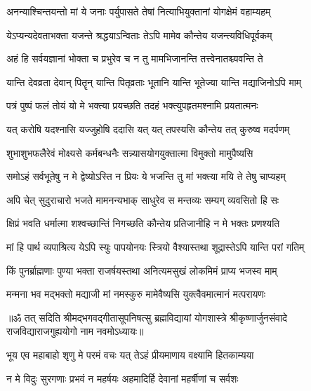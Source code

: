 \twolineshloka
{अनन्याश्चिन्तयन्तो मां ये जनाः पर्युपासते}
{तेषां नित्याभियुक्तानां योगक्षेमं वहाम्यहम्}%

\twolineshloka
{येऽप्यन्यदेवताभक्ता यजन्ते श्रद्धयाऽन्विताः}
{तेऽपि मामेव कौन्तेय यजन्त्यविधिपूर्वकम्}%

\twolineshloka
{अहं हि सर्वयज्ञानां भोक्ता च प्रभुरेव च}
{न तु मामभिजानन्ति तत्त्वेनातश्च्यवन्ति ते}%

\twolineshloka
{यान्ति देवव्रता देवान् पितॄन् यान्ति पितृव्रताः}
{भूतानि यान्ति भूतेज्या यान्ति मद्याजिनोऽपि माम्}%

\twolineshloka
{पत्रं पुष्पं फलं तोयं यो मे भक्त्या प्रयच्छति}
{तदहं भक्त्युपहृतमश्नामि प्रयतात्मनः}%

\twolineshloka
{यत् करोषि यदश्नासि यज्जुहोषि ददासि यत्}
{यत् तपस्यसि कौन्तेय तत् कुरुष्व मदर्पणम्}%

\twolineshloka
{शुभाशुभफलैरेवं मोक्ष्यसे कर्मबन्धनैः}
{सन्न्यासयोगयुक्तात्मा विमुक्तो मामुपैष्यसि}%

\twolineshloka
{समोऽहं सर्वभूतेषु न मे द्वेष्योऽस्ति न प्रियः}
{ये भजन्ति तु मां भक्त्या मयि ते तेषु चाप्यहम्}%

\twolineshloka
{अपि चेत् सुदुराचारो भजते मामनन्यभाक्}
{साधुरेव स मन्तव्यः सम्यग् व्यवसितो हि सः}%

\twolineshloka
{क्षिप्रं भवति धर्मात्मा शश्वच्छान्तिं निगच्छति}
{कौन्तेय प्रतिजानीहि न मे भक्तः प्रणश्यति}%

\twolineshloka
{मां हि पार्थ व्यपाश्रित्य येऽपि स्युः पापयोनयः}
{स्त्रियो वैश्यास्तथा शूद्रास्तेऽपि यान्ति परां गतिम्}%

\twolineshloka
{किं पुनर्ब्राह्मणाः पुण्या भक्ता राजर्षयस्तथा}
{अनित्यमसुखं लोकमिमं प्राप्य भजस्व माम्}%

\twolineshloka
{मन्मना भव मद्भक्तो मद्याजी मां नमस्कुरु}
{मामेवैष्यसि युक्त्वैवमात्मानं मत्परायणः}%

{॥ॐ तत् सदिति श्रीमद्भगवद्गीतासूपनिषत्सु ब्रह्मविद्यायां योगशास्त्रे श्रीकृष्णार्जुनसंवादे राजविद्याराजगुह्ययोगो नाम नवमोऽध्यायः॥}



\twolineshloka
{भूय एव महाबाहो शृणु मे परमं वचः}
{यत् तेऽहं प्रीयमाणाय वक्ष्यामि हितकाम्यया}%

\twolineshloka
{न मे विदुः सुरगणाः प्रभवं न महर्षयः}
{अहमादिर्हि देवानां महर्षीणां च सर्वशः}%

